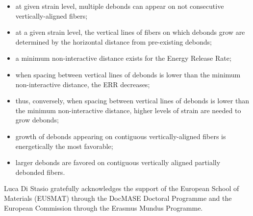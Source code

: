 \documentclass[smallextended]{svjour3}       %
\begin{document}
\begin{itemize}
\item at given strain level, multiple debonds can appear on not consecutive vertically-aligned fibers;
\item at a given strain level, the vertical lines of fibers on which debonds grow are determined by the horizontal distance from pre-existing debonds;
\item a minimum non-interactive distance exists for the Energy Release Rate;
\item when spacing between vertical lines of debonds is lower than the minimum non-interactive distance, the ERR decreases;
\item thus, conversely, when spacing between vertical lines of debonds is lower than the minimum non-interactive distance, higher levels of strain are needed to grow debonds;
\item growth of debonds appearing on contiguous vertically-aligned fibers is energetically the most favorable;
\item larger debonds are favored on contiguous vertically aligned partially debonded fibers.
\end{itemize}



\begin{acknowledgements}
Luca Di Stasio gratefully acknowledges the support of the European School of Materials (EUSMAT) through the DocMASE Doctoral Programme and the European Commission through the Erasmus Mundus Programme.
\end{acknowledgements}


%
%



\end{document}
